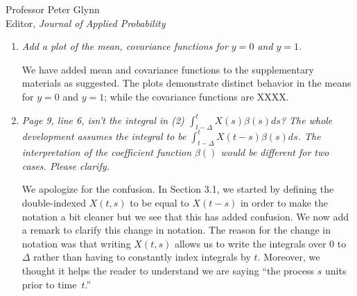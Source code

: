 \documentclass[11pt]{letter} %
\begin{document}
\begin{letter}{Professor
	Peter Glynn\\
	Editor, {\em Journal of Applied Probability}}
\begin{enumerate}
\vspace{5mm}
The event times~$T_i$ depend heavily on the event intensity function~$h_i (t;\theta)$ and will not be guaranteed to be uniformly spread across points in $[0,\tau]$.  The subsampling times~$D_i$ depend on the subsampling intensity function~$\pi_i(t)$; under the assumption that $\pi_i (t) = \lambda$, we can view this as first drawing the number of non-event times from a Poisson distribution, i.e., $| D_i | \sim Poisson(\lambda)$, and then independently selecting $|D_i|$ non-event times uniformly at random over the observation window~$[0, \tau_i]$.  Given the potential difference between the distributions, we choose to model the mean and covariance functions separately to ensure good approximation when applying th espectral decomposition of the estimated covariance function.
\vspace{5mm}

Another reason for treating these two distinctly is that the missing data imputation from XXXX requires distinct covariance functions.  We do think one could marginalize across the two if the mean and covariance functions are not expected to differ greatly and state as such in Section XX (in blue) where we discuss the new Figure XX of the mean and covariance functions for $y=0$ and $y=1$.
\vspace{5mm}

\item {\it Add a plot of the mean, covariance functions for $y=0$ and $y=1$.}

\vspace{5mm}
We have added mean and covariance functions to the supplementary materials as suggested.  The plots demonstrate distinct behavior in the means for $y=0$ and $y=1$; while the covariance functions are XXXX.
\vspace{5mm}

\item {\it Page 9, line 6, isn’t the integral in (2) $\int_{t-\Delta}^t X(s) \beta(s)ds$? The whole development assumes the integral to be $\int_{t-\Delta}^t X(t-s) \beta(s)ds$. The interpretation of the coefficient function $\beta()$ would be different for two cases. Please clarify.}

\vspace{5mm}
We apologize for the confusion.  In Section 3.1, we started by defining the double-indexed $X(t,s)$ to be equal to $X(t-s)$ in order to make the notation a bit cleaner but we see that this has added confusion.  We now add a remark to clarify this change in notation.  The reason for the change in notation was that writing $X(t,s)$ allows us to write the integrals over $0$ to $\Delta$ rather than having to constantly index integrals by $t$.  Moreover, we thought it helps the reader to understand we are saying ``the process $s$ units prior to time~$t$.''
\vspace{5mm}


\end{enumerate}
\end{letter}
\end{document}
